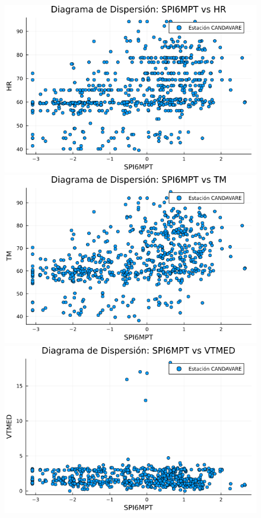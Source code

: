 \begin{figure}[htbp]
\begin{minipage}{0.32\textwidth}
    \centering
    \includegraphics[width=\linewidth]{Capitulos/Scaterplot/CANDAVARE_SPI6MPT_vs_HR.png}
\end{minipage}\hfill
\begin{minipage}{0.32\textwidth}
    \centering
    \includegraphics[width=\linewidth]{Capitulos/Scaterplot/CANDAVARE_SPI6MPT_vs_TM.png}
\end{minipage}\hfill
\begin{minipage}{0.32\textwidth}
    \centering
    \includegraphics[width=\linewidth]{Capitulos/Scaterplot/CANDAVARE_SPI6MPT_vs_VTMED.png}
\end{minipage}


\end{figure}
